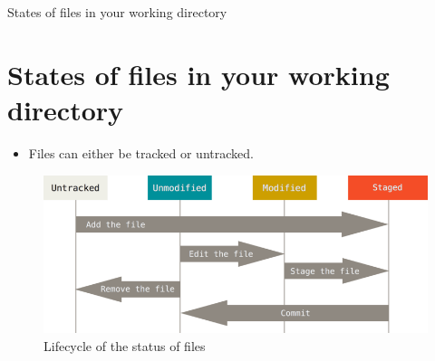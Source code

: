 \documentclass{beamer}
\begin{document}
\begin{frame}{States of files in your working directory}
\section{States of files in your working directory}
	\begin{itemize}
		\item Files can either be tracked or untracked.
	\end{itemize}
	\begin{figure}
		\includegraphics[scale=0.4]{images/lifecycle}
		\caption{Lifecycle of the status of files\cite{recording-changes-git}}
	\end{figure}
\end{frame}	
\end{document}
